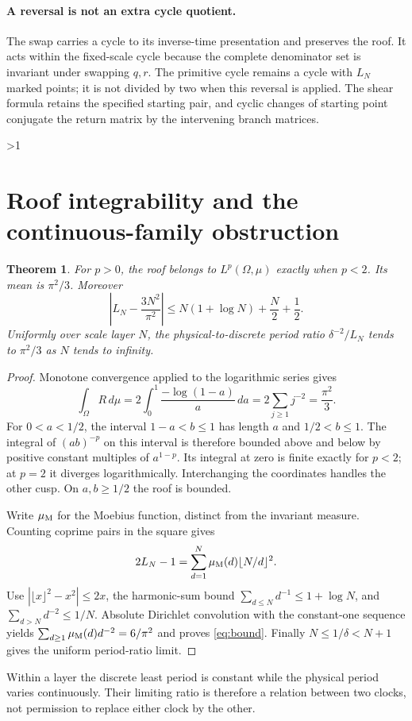 \documentclass[10pt]{article}
\newtheorem{theorem}{Theorem}
\begin{document}
\paragraph{A reversal is not an extra cycle quotient.}
The swap carries a cycle to its inverse-time presentation and preserves
the roof. It acts within the fixed-scale cycle because the complete
denominator set is invariant under swapping $q,r$.
The primitive cycle remains a cycle with $L_N$ marked points; it is not
divided by two when this reversal is applied. The shear formula retains
the specified starting pair, and cyclic changes of starting point
conjugate the return matrix by the intervening branch matrices.
\fi

\ifnum\CRevisionRound>1
\section{Roof integrability and the continuous-family obstruction}
\begin{theorem}\label{thm:roof}
For $p>0$, the roof belongs to $L^p(\Omega,\mu)$ exactly when $p<2$.
Its mean is $\pi^2/3$. Moreover
\begin{equation}\label{eq:bound}
\left|L_N-\frac{3N^2}{\pi^2}\right|
\leq N(1+\log N)+\frac N2+\frac12.
\end{equation}
Uniformly over scale layer $N$, the physical-to-discrete period ratio
$\delta^{-2}/L_N$ tends to $\pi^2/3$ as $N$ tends to infinity.
\end{theorem}
\begin{proof}
Monotone convergence applied to the logarithmic series gives
\[
\int_\Omega R\,d\mu
=2\int_0^1\frac{-\log(1-a)}a\,da
=2\sum_{j\geq1}j^{-2}=\frac{\pi^2}{3}.
\]
For $0<a<1/2$, the interval $1-a<b\leq1$ has length $a$ and
$1/2<b\leq1$. The integral of $(ab)^{-p}$ on this interval is therefore
bounded above and below by positive constant multiples of $a^{1-p}$.
Its integral at zero is finite exactly for $p<2$; at $p=2$ it diverges
logarithmically. Interchanging the coordinates handles the other cusp.
On $a,b\geq1/2$ the roof is bounded.

Write $\mu_{\rm M}$ for the Moebius function, distinct from the invariant
measure. Counting coprime pairs in the square gives
\[
2L_N-1=\sum_{d=1}^N\mu_{\rm M}(d)\lfloor N/d\rfloor^2.
\]
Use $|\lfloor x\rfloor^2-x^2|\leq2x$, the harmonic-sum bound
$\sum_{d\leq N}d^{-1}\leq1+\log N$, and
$\sum_{d>N}d^{-2}\leq1/N$.
Absolute Dirichlet convolution with the constant-one sequence yields
$\sum_{d\geq1}\mu_{\rm M}(d)d^{-2}=6/\pi^2$ and proves \eqref{eq:bound}.
Finally $N\leq1/\delta<N+1$ gives the uniform period-ratio limit.
\end{proof}
Within a layer the discrete least period is constant while the physical
period varies continuously. Their limiting ratio is therefore a relation
between two clocks, not permission to replace either clock by the other.
\end{document}
